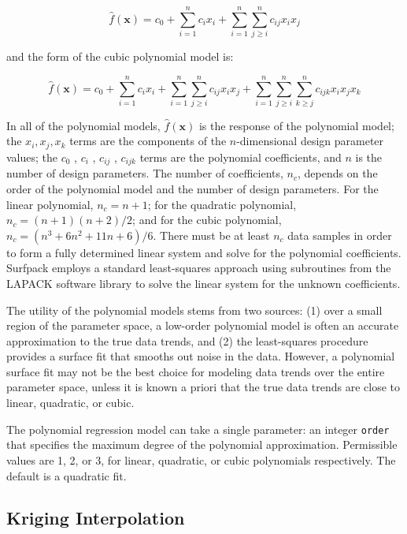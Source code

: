 \documentclass{article}
\begin{document}
\begin{equation}
  \hat{f}(\mathbf{x}) = c_{0}+\sum_{i=1}^{n}c_{i}x_{i}
  +\sum_{i=1}^{n}\sum_{j \ge i}^{n}c_{ij}x_{i}x_{j}
  \label{models:surf:equation02}
\end{equation}

and the form of the cubic polynomial model is:

\begin{equation}
  \hat{f}(\mathbf{x}) = c_{0}+\sum_{i=1}^{n}c_{i}x_{i}
  +\sum_{i=1}^{n}\sum_{j \ge i}^{n}c_{ij}x_{i}x_{j}
  +\sum_{i=1}^{n}\sum_{j \ge i}^{n}\sum_{k \ge j}^{n}
  c_{ijk}x_{i}x_{j}x_{k}
  \label{models:surf:equation03}
\end{equation}

In all of the polynomial models, $\hat{f}(\mathbf{x})$ is the response
of the polynomial model; the $x_{i},x_{j},x_{k}$ terms are the
components of the $n$-dimensional design parameter values; the $c_{0}$
, $c_{i}$ , $c_{ij}$ , $c_{ijk} $ terms are the polynomial
coefficients, and $n$ is the number of design parameters.  The number
of coefficients, $n_{c}$, depends on the order of the polynomial model and
the number of design parameters. For the linear polynomial, $n_c =n+1$;
for the quadratic polynomial, $n_c = (n+1)(n+2)/2$;
and for the cubic polynomial, $n_c = (n^{3}+6 n^{2}+11 n+6)/6$.
There must be at least $n_{c}$ data samples in order to form a fully
determined linear system and solve for the polynomial coefficients. 
Surfpack employs a standard least-squares approach using subroutines from the LAPACK software library to solve the linear system for the unknown coefficients.

The utility of the polynomial models stems from two sources: (1) over
a small region of the parameter space, a low-order polynomial model
is often an accurate approximation to the true data trends, and (2)
the least-squares procedure provides a surface fit that smooths out
noise in the data.  However, a polynomial surface fit may
not be the best choice for modeling data trends over the entire
parameter space, unless it is known a priori that the true data trends
are close to linear, quadratic, or cubic.

The polynomial regression model can take a single parameter: an integer \texttt{order} that specifies the maximum degree of the polynomial approximation.  Permissible values are 1, 2, or 3, for linear, quadratic, or cubic polynomials respectively.  The default is a quadratic fit.


\subsection{Kriging Interpolation }\label{models:surf:kriging}
\end{document}
